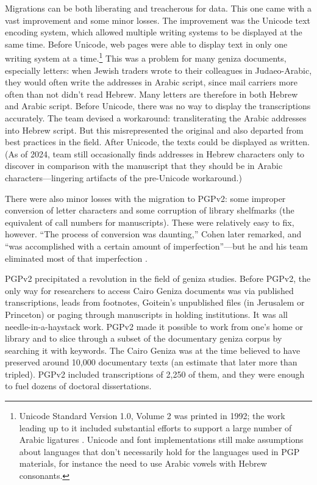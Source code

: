 \documentclass{article}
\begin{document}
Migrations can be both liberating and treacherous for data. This one came with a vast improvement and some minor losses. The improvement was the Unicode text encoding system, which allowed multiple writing systems to be displayed at the same time. Before Unicode, web pages were able to display text in only one writing system at a time.\footnote{Unicode Standard Version 1.0, Volume 2 was printed in 1992; the work leading up to it included substantial efforts to support a large number of Arabic ligatures \autocite{noauthor_chronology_nodate}. Unicode and font implementations still make assumptions about languages that don't necessarily hold for the languages used in PGP materials, for instance the need to use Arabic vowels with Hebrew consonants.} This was a problem for many geniza documents, especially letters: when Jewish traders wrote to their colleagues in Judaeo-Arabic, they would often write the addresses in Arabic script, since mail carriers more often than not didn't read Hebrew. Many letters are therefore in both Hebrew and Arabic script. Before Unicode, there was no way to display the transcriptions accurately. The team devised a workaround: transliterating the Arabic addresses into Hebrew script. But this misrepresented the original and also departed from best practices in the field. After Unicode, the texts could be displayed as written. (As of 2024,  team still occasionally finds addresses in Hebrew characters only to discover in comparison with the manuscript that they should be in Arabic characters—lingering artifacts of the pre-Unicode workaround.) 

There were also minor losses with the migration to PGPv2: some improper conversion of letter characters and some corruption of library shelfmarks (the equivalent of call numbers for manuscripts). These were relatively easy to fix, however. “The process of conversion was daunting,” Cohen later remarked, and “was accomplished with a certain amount of imperfection”—but he and his team eliminated most of that imperfection \autocite[43]{cohen_princeton_2014}.

PGPv2 precipitated a revolution in the field of geniza studies. Before PGPv2, the only way for researchers to access Cairo Geniza documents was via published transcriptions, leads from footnotes, Goitein’s unpublished files (in Jerusalem or Princeton) or paging through manuscripts in holding institutions. It was all needle-in-a-haystack work. PGPv2 made it possible to work from one’s home or library and to slice through a subset of the documentary geniza corpus by searching it with keywords. The Cairo Geniza was at the time believed to have preserved around 10,000 documentary texts (an estimate that later more than tripled). PGPv2 included transcriptions of 2,250 of them, and they were enough to fuel dozens of doctoral dissertations. 
\end{document}
